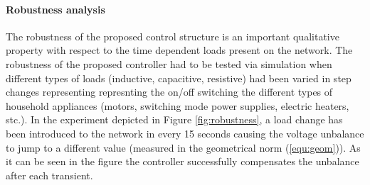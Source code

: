       \paragraph{Robustness analysis}

            The robustness of the proposed control structure is an important qualitative property with respect to the time dependent loads present on the network. The robustness of the proposed controller had to be tested via simulation when different types of loads (inductive, capacitive, resistive) had been varied in step changes representing represnting the on/off switching the different types of household appliances (motors, switching mode power supplies, electric heaters, stc.). In the experiment depicted in Figure \ref{fig:robustness}, a load change has been introduced to the network in every 15 seconds causing the voltage unbalance to jump to a different value (measured in the geometrical norm (\ref{equ:geom})). As it can be seen in the figure the controller successfully compensates the unbalance after each transient.


